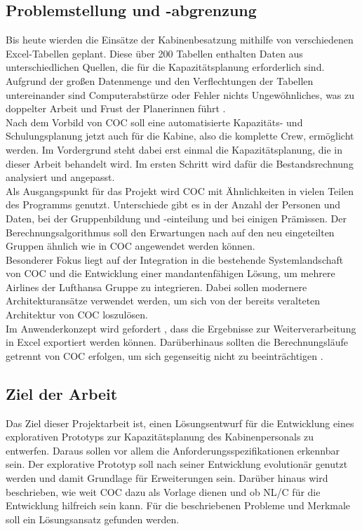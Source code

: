 \documentclass [12pt, a4paper, oneside, titlepage, ngerman]{article}
\begin{document}
\subsection {Problemstellung und -abgrenzung}
Bis heute wierden die Einsätze der Kabinenbesatzung mithilfe von verschiedenen Excel-Tabellen geplant. Diese über 200 Tabellen enthalten Daten aus unterschiedlichen Quellen, die für die Kapazitätsplanung erforderlich sind. Aufgrund der großen Datenmenge und den Verflechtungen der Tabellen untereinander sind Computerabstürze oder Fehler nichts Ungewöhnliches, was zu doppelter Arbeit und Frust der Planerinnen führt \cite[vgl.][]{Gespraech2}. \\ 

\noindent Nach dem Vorbild von \ac{COC} soll eine automatisierte Kapazitäts- und Schulungsplanung jetzt auch für die Kabine, also die komplette Crew, ermöglicht werden. Im Vordergrund steht dabei erst einmal die Kapazitätsplanung, die in dieser Arbeit behandelt wird. Im ersten Schritt wird dafür die Bestandsrechnung analysiert und angepasst.\\ %
Als Ausgangspunkt für das Projekt wird \ac{COC} mit Ähnlichkeiten in vielen Teilen des Programms genutzt. Unterschiede gibt es in der Anzahl der Personen und Daten, bei der Gruppenbildung und -einteilung und bei einigen Prämissen. Der Berechnungsalgorithmus soll den Erwartungen nach auf den neu eingeteilten Gruppen ähnlich wie in \ac{COC} angewendet werden können. \\

\noindent Besonderer Fokus liegt auf der Integration in die bestehende Systemlandschaft von \ac{COC} und die Entwicklung einer mandantenfähigen Lösung, um mehrere Airlines der Lufthansa Gruppe zu integrieren. Dabei sollen modernere Architekturansätze verwendet werden, um sich von der bereits veralteten Architektur von \ac{COC} loszulösen. \\
Im Anwenderkonzept wird gefordert , dass die Ergebnisse zur Weiterverarbeitung in Excel exportiert werden können. Darüberhinaus sollten die Berechnungsläufe getrennt von \ac{COC} erfolgen, um sich gegenseitig nicht zu beeinträchtigen \cite[vgl. dazu][]{anwenderkonzept}.

\subsection {Ziel der Arbeit} 
Das Ziel dieser Projektarbeit ist, einen Lösungsentwurf für die Entwicklung eines explorativen Prototyps zur Kapazitätsplanung des Kabinenpersonals zu entwerfen. Daraus sollen vor allem die Anforderungsspezifikationen erkennbar sein. Der explorative Prototyp soll nach seiner Entwicklung evolutionär genutzt werden und damit Grundlage für Erweiterungen sein. Darüber hinaus wird beschrieben, wie weit \ac{COC} dazu als Vorlage dienen und ob \ac{NL/C} für die Entwicklung hilfreich sein kann. Für die beschriebenen Probleme und Merkmale soll ein Lösungsansatz gefunden werden.
\end{document}
